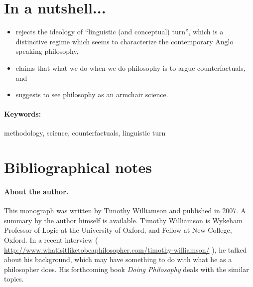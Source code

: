 \documentclass[
10pt, %
a4paper, %
twocolumn, %
landscape %
]{article}
\begin{document}
\pagestyle{myheadings} %
\markright{\doctitle} %


\thispagestyle{plain} %

\printtitle %


\section*{In a nutshell... }
\cite{Williamson2007}
\begin{itemize}
	\item	rejects the ideology of ``linguistic (and conceptual) turn'', which is a distinctive regime which seems to characterize the contemporary Anglo speaking philosophy,
	\item	claims that what we do when we do philosophy is to argue counterfactuals, and
	\item	suggests to see philosophy as an armchair science.  
\end{itemize}

\paragraph{Keywords:} 
methodology, science, counterfactuals, linguistic turn



\section*{Bibliographical notes} %

\paragraph{About the author.}
This monograph \cite{Williamson2007} was written by Timothy Williamson and published in 2007. 
A summary by the author himself \cite{williamson2010} is available. 
Timothy Williamson is Wykeham Professor of Logic at the University of Oxford, and Fellow at New College, Oxford.
In a recent interview (  \url{http://www.whatisitliketobeaphilosopher.com/timothy-williamson/} ), he talked about his background, which may have something to do with what he as a philosopher does.
His forthcoming book \textit{Doing Philosophy} deals with the similar topics. 
\end{document}
